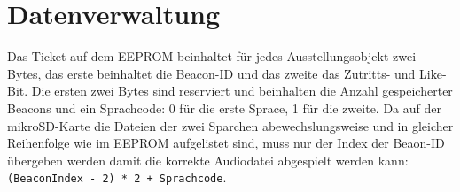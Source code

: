  \section{Datenverwaltung}
Das Ticket auf dem EEPROM beinhaltet für jedes Ausstellungsobjekt zwei Bytes, das erste beinhaltet die Beacon-ID und das zweite das Zutritts- und Like-Bit.
Die ersten zwei Bytes sind reserviert und beinhalten die Anzahl gespeicherter Beacons und ein Sprachcode: 0 für die erste Sprace, 1 für die zweite.
Da auf der mikroSD-Karte die Dateien der zwei Sparchen abewechslungsweise und in gleicher Reihenfolge wie im EEPROM aufgelistet sind, muss nur der Index der Beaon-ID übergeben werden damit die korrekte Audiodatei abgespielt werden kann: \\
\texttt{(BeaconIndex - 2) * 2 + Sprachcode}.
